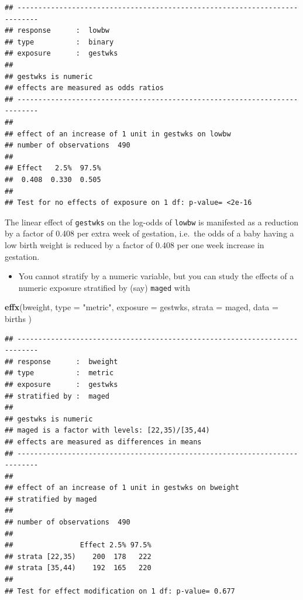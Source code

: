 \documentclass[
]{book}
\newenvironment{Shaded}{\begin{snugshade}}{\end{snugshade}}
\newcommand{\AttributeTok}[1]{\textcolor[rgb]{0.13,0.29,0.53}{#1}}
\newcommand{\FunctionTok}[1]{\textcolor[rgb]{0.13,0.29,0.53}{\textbf{#1}}}
\newcommand{\NormalTok}[1]{#1}
\newcommand{\StringTok}[1]{\textcolor[rgb]{0.31,0.60,0.02}{#1}}
\providecommand{\tightlist}{%
  \setlength{\itemsep}{0pt}\setlength{\parskip}{0pt}}
\begin{document}
\begin{verbatim}
## --------------------------------------------------------------------------- 
## response      :  lowbw 
## type          :  binary 
## exposure      :  gestwks 
## 
## gestwks is numeric 
## effects are measured as odds ratios 
## --------------------------------------------------------------------------- 
## 
## effect of an increase of 1 unit in gestwks on lowbw 
## number of observations  490 
## 
## Effect   2.5%  97.5% 
##  0.408  0.330  0.505 
## 
## Test for no effects of exposure on 1 df: p-value= <2e-16
\end{verbatim}

The linear effect of \texttt{gestwks} on the log-odds of \texttt{lowbw} is manifested as a reduction by a factor of 0.408 per extra week of gestation, i.e.~the odds of a baby having a low birth weight is reduced by a factor of 0.408 per one week increase in gestation.

\begin{itemize}
\tightlist
\item
  You cannot stratify by a numeric variable,
  but you can study the effects of a
  numeric exposure stratified by (say) \texttt{maged} with
\end{itemize}

\begin{Shaded}
\begin{Highlighting}[]
\FunctionTok{effx}\NormalTok{(bweight,}
  \AttributeTok{type =} \StringTok{"metric"}\NormalTok{, }\AttributeTok{exposure =}\NormalTok{ gestwks, }\AttributeTok{strata =}\NormalTok{ maged,}
  \AttributeTok{data =}\NormalTok{ births}
\NormalTok{)}
\end{Highlighting}
\end{Shaded}

\begin{verbatim}
## --------------------------------------------------------------------------- 
## response      :  bweight 
## type          :  metric 
## exposure      :  gestwks 
## stratified by :  maged 
## 
## gestwks is numeric 
## maged is a factor with levels: [22,35)/[35,44) 
## effects are measured as differences in means 
## --------------------------------------------------------------------------- 
## 
## effect of an increase of 1 unit in gestwks on bweight 
## stratified by maged 
## 
## number of observations  490 
## 
##                Effect 2.5% 97.5%
## strata [22,35)    200  178   222
## strata [35,44)    192  165   220
## 
## Test for effect modification on 1 df: p-value= 0.677
\end{verbatim}
\end{document}
